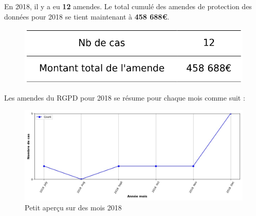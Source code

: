 \documentclass[french]{article}
\begin{document}
	\begin{multicols}{2}
	
	En 2018,  il y a eu \textbf{12} amendes.
	Le total cumulé des amendes de protection des données pour 2018 se tient maintenant à \textbf{458 688€}.
	
	\begin{figure}[H]
	\centering\includegraphics[width=1\linewidth]{graphs/counter_year}
	\end{figure}


	Les amendes du RGPD pour 2018 se résume pour chaque mois comme suit :

	\begin{figure}
	[H]\centering\includegraphics[width = 1.2\linewidth]{graphs/NbFinesPerMonth_year_graph}
	\caption{Petit aperçu sur des mois 2018}
	\end{figure}

	\end{multicols}
\end{document}
